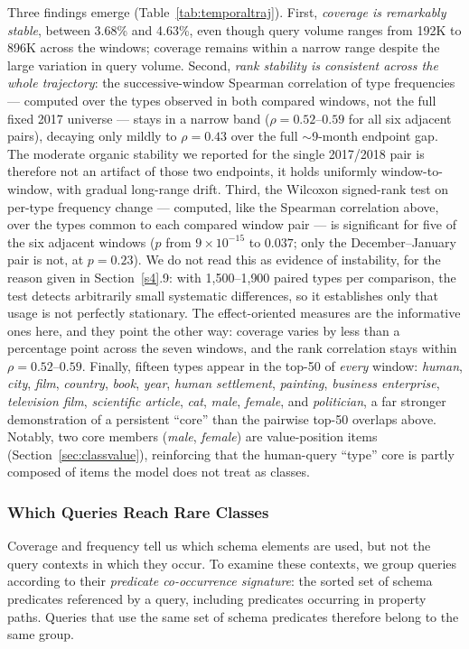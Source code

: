 \documentclass[sw]{iosart2x}
\begin{document}
Three findings emerge (Table~\ref{tab:temporaltraj}). First, \emph{coverage is remarkably stable}, between 3.68\% and 4.63\%, even though query volume ranges from 192K to 896K across the windows; coverage remains within a narrow range despite the large variation in query volume. Second, \emph{rank stability is consistent across the whole trajectory}: the successive-window Spearman correlation of type frequencies — computed over the types observed in both compared windows, not the full fixed 2017 universe — stays in a narrow band ($\rho = 0.52$--$0.59$ for all six adjacent pairs), decaying only mildly to $\rho = 0.43$ over the full $\sim$9-month endpoint gap. The moderate organic stability we reported for the single 2017/2018 pair is therefore not an artifact of those two endpoints, it holds uniformly window-to-window, with gradual long-range drift. Third, the Wilcoxon signed-rank test on per-type frequency change — computed, like the Spearman correlation above, over the types common to each compared window pair — is significant for five of the six adjacent windows ($p$ from $9{\times}10^{-15}$ to $0.037$; only the December--January pair is not, at $p = 0.23$). We do not read this as evidence of instability, for the reason given in Section~\ref{s4}.9: with 1{,}500--1{,}900 paired types per comparison, the test detects arbitrarily small systematic differences, so it establishes only that usage is not perfectly stationary. The effect-oriented measures are the informative ones here, and they point the other way: coverage varies by less than a percentage point across the seven windows, and the rank correlation stays within $\rho = 0.52$--$0.59$. Finally, fifteen types appear in the top-50 of \emph{every} window: \emph{human}, \emph{city}, \emph{film}, \emph{country}, \emph{book}, \emph{year}, \emph{human settlement}, \emph{painting}, \emph{business enterprise}, \emph{television film}, \emph{scientific article}, \emph{cat}, \emph{male}, \emph{female}, and \emph{politician}, a far stronger demonstration of a persistent ``core'' than the pairwise top-50 overlaps above. Notably, two core members (\emph{male}, \emph{female}) are value-position items (Section~\ref{sec:classvalue}), reinforcing that the human-query ``type'' core is partly composed of items the model does not treat as classes.


\subsubsection{Which Queries Reach Rare Classes}\label{sec:templates}
Coverage and frequency tell us which schema elements are used, but not the query contexts in which they occur. To examine these contexts, we group queries according to their \emph{predicate co-occurrence signature}: the sorted set of schema predicates referenced by a query, including predicates occurring in property paths. Queries that use the same set of schema predicates therefore belong to the same group.
\end{document}
